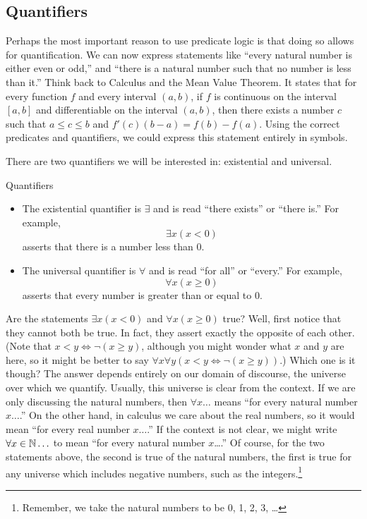 \documentclass[12pt]{article}
\begin{document}
\subsection{Quantifiers}

Perhaps the most important reason to use predicate logic is that doing so allows for quantification.  We can now express statements like ``every natural number is either even or odd,'' and ``there is a natural number such that no number is less than it.''  Think back to Calculus and the Mean Value Theorem.  It states that for every function $f$ and every interval $(a, b)$, if $f$ is continuous on the interval $[a,b]$ and differentiable on the interval $(a,b)$, then there exists a number $c$ such that $a \le c \le b$ and $f'(c)(b - a) = f(b) - f(a)$.  Using the correct predicates and quantifiers, we could express this statement entirely in symbols.

There are two quantifiers we will be interested in: existential and universal.

\begin{defbox}{Quantifiers}
  \begin{itemize}
    \item The existential quantifier is $\exists$ and is read ``there exists'' or ``there is.''  For example,
\[\exists x (x < 0)\]
asserts that there is a number less than 0.
\item The universal quantifier is $\forall$ and is read ``for all'' or ``every.''  For example,
\[\forall x (x \ge 0)\]
asserts that every number is greater than or equal to 0.
  \end{itemize}
\end{defbox}

  Are the statements $\exists x (x < 0)$ and $\forall x (x \ge 0)$ true?  Well, first notice that they cannot both be true.  In fact, they assert exactly the opposite of each other.  (Note that $x < y \iff \neg(x \ge y)$, although you might wonder what $x$ and $y$ are here, so it might be better to say $\forall x \forall y\left(x < y \iff \neg(x \ge y)\right)$.)  Which one is it though?  The answer depends entirely on our domain of discourse, the universe over which we quantify.  Usually, this universe is clear from the context.  If we are only discussing the natural numbers, then $\forall x \ldots$ means ``for every natural number $x \ldots$.''  On the other hand, in calculus we care about the real numbers, so it would mean ``for every real number $x \ldots$.''  If the context is not clear, we might write $\forall x \in \mathbb N\ldots$
  to mean ``for every natural number $x$\ldots.''  Of course, for the two statements above, the second is true of the natural numbers, the first is true for any universe which includes negative numbers, such as the integers.\footnote{Remember, we take the natural
numbers to be 0, 1, 2, 3, \ldots}
\end{document}
